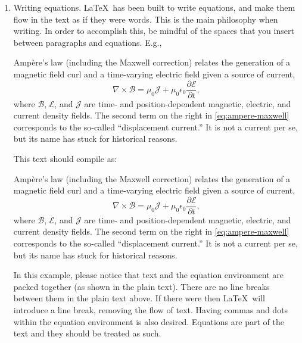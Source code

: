 \begin{enumerate}
  \item Writing equations. \LaTeX\ has been built to write equations, and make them flow in the text as if they were words. This is the main philosophy when writing. In order to accomplish this, be mindful of the spaces that you insert between paragraphs and equations. E.g.,
  
  \begin{verbnobox}[\small]
    Ampère's law (including the Maxwell correction) relates the generation 
    of a magnetic field curl and a time-varying electric field given a 
    source of current,
    \begin{equation}
      \nabla \times \boldsymbol{\mathcal{B}} = 
      \mu_0 \boldsymbol{\mathcal{J}} + 
      \mu_0 \epsilon_0 \frac{\partial\boldsymbol{\mathcal{E}}}{\partial t},
    \end{equation}
    where $\boldsymbol{\mathcal{B}}$, $\boldsymbol{\mathcal{E}}$, 
    and $\boldsymbol{\mathcal{J}}$ are time- and position-dependent 
    magnetic, electric, and current density fields. 
    The second term on the right in 
    \cref{eq:ampere-maxwell} corresponds to the so-called 
    ``displacement current.'' It is not a current per se, but its name 
    has stuck for historical reasons.
  \end{verbnobox}
  
  This text should compile as:

  Ampère's law (including the Maxwell correction) relates the generation of a magnetic field curl and a time-varying electric field given a source of current,
  \begin{equation}
    \nabla \times \boldsymbol{\mathcal{B}} = \mu_0 \boldsymbol{\mathcal{J}} + \mu_0 \epsilon_0 \frac{\partial \boldsymbol{\mathcal{E}}}{\partial t}, \label{eq:ampere-maxwell}
  \end{equation}
  where $\boldsymbol{\mathcal{B}}$, $\boldsymbol{\mathcal{E}}$, and $\boldsymbol{\mathcal{J}}$ are time- and position-dependent magnetic, electric, and current density fields. The second term on the right in \cref{eq:ampere-maxwell} corresponds to the so-called ``displacement current.'' It is not a current per se, but its name has stuck for historical reasons.

  In this example, please notice that text and the equation environment are packed together (as shown in the plain text). There are no line breaks between them in the plain text above. If there were then \LaTeX\ will introduce a line break, removing the flow of text. Having commas and dots within the equation environment is also desired. Equations are part of the text and they should be treated as such.
  

\end{enumerate}
